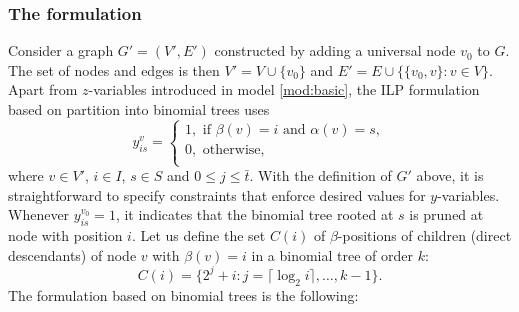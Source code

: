 \subsubsection{The formulation}
Consider a graph $G'=(V',E')$ constructed  by adding a universal node $v_0$ to $G$. 
The set of nodes and edges is then $V'=V\cup \{v_0\}$ and $E'=E\cup\{\{v_0,v\}:v\in V\}$.
Apart from $z$-variables introduced in model \eqref{mod:basic}, the ILP formulation based on partition into binomial trees uses 
$$
y_{is}^v=\begin{cases}
1, \text{ if } \beta(v)=i \text{ and } \alpha(v)=s,\\ 
0, \text{ otherwise},\\
\end{cases}
$$
where $v\in V'$, $i\in I$, $s\in S$ and $0\leq j\leq \bar{t}$. 
With the definition of $G'$ above, it is straightforward to specify constraints that enforce desired values for $y$-variables.
Whenever $y_{is}^{v_0}=1$, it indicates that the binomial tree rooted at $s$ is pruned at node with position $i$.
Let us define the set $C(i)$ of $\beta$-positions of children (direct descendants) of node $v$ with $\beta(v)=i$ in a binomial tree of order $k$:
\begin{equation}
\label{eq:c1}
C(i)=\{2^j+i:j=\lceil\log_2 i\rceil,\dots,k-1\}.
\end{equation}
The formulation based on binomial trees is the following:
